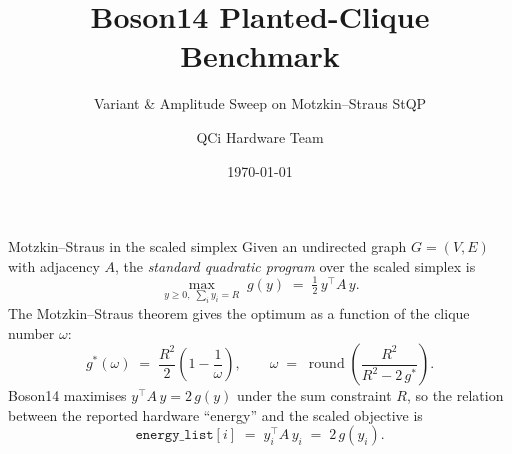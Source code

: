 \documentclass[aspectratio=169]{beamer}
\title{Boson14 Planted-Clique Benchmark}
\subtitle{Variant \& Amplitude Sweep on Motzkin--Straus StQP}
\author{QCi Hardware Team}
\date{\today}
\institute{Quantum Computing Inc.}
\begin{document}

\maketitle


\begin{frame}{Motzkin--Straus in the scaled simplex}
Given an undirected graph $G=(V,E)$ with adjacency $A$, the \emph{standard
quadratic program} over the scaled simplex is
\[
\max_{y \ge 0,\; \sum_i y_i = R}\; g(y) \;=\; \tfrac{1}{2}\, y^\top A\, y .
\]
The Motzkin--Straus theorem gives the optimum as a function of the clique number $\omega$:
\[
g^\ast(\omega) \;=\; \frac{R^{2}}{2}\!\left(1 - \frac{1}{\omega}\right),
\qquad
\omega \;=\; \operatorname{round}\!\left(\frac{R^{2}}{R^{2} - 2\, g^\ast}\right).
\]
Boson14 maximises $y^\top A\, y = 2\,g(y)$ under the sum constraint $R$, so the
relation between the reported hardware ``energy'' and the scaled objective is
\[
\texttt{energy\_list}[i] \;=\; y_i^\top A\, y_i \;=\; 2\, g(y_i).
\]
\end{frame}

\end{document}
